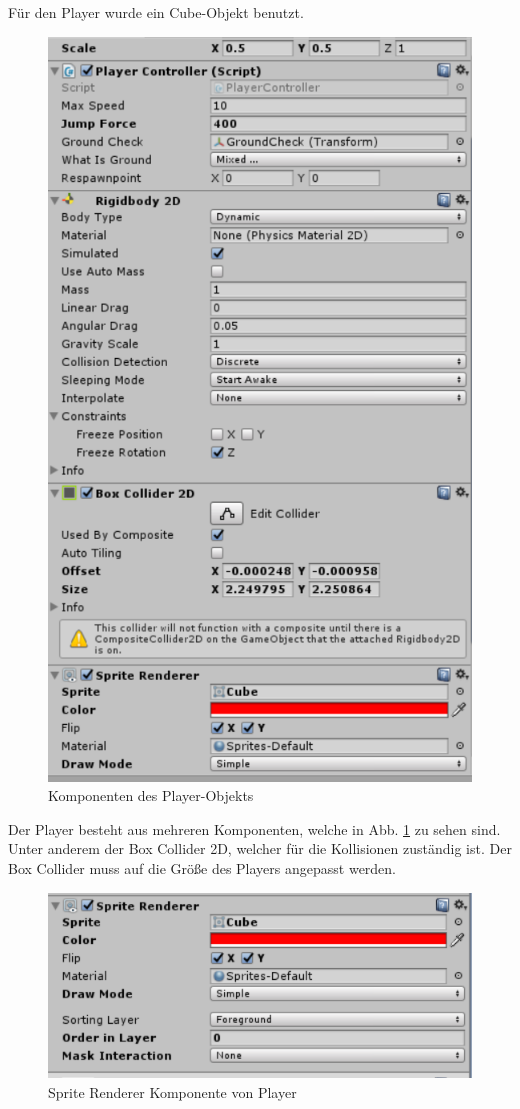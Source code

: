 Für den Player wurde ein Cube-Objekt benutzt.
\begin{figure}[H]
	\includegraphics{images/Player.png}
	\caption{Komponenten des Player-Objekts}
	\label{PlayerKomponenten}
\end{figure}
Der Player besteht aus mehreren Komponenten, welche in Abb. \ref{PlayerKomponenten} zu sehen sind. Unter anderem der Box Collider 2D, welcher für die Kollisionen zuständig ist. Der Box Collider muss auf die Größe des Players angepasst werden.
\begin{figure}[H]
	\includegraphics[width=15cm]{images/SpriteRenderer.png}
	\caption{Sprite Renderer Komponente von Player}
\end{figure}
